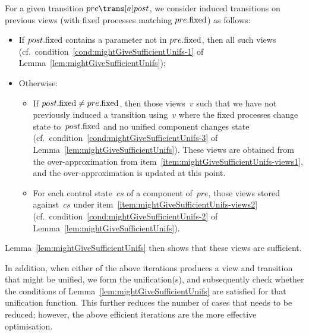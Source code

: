 For a given transition $pre \trans[a] post$, we consider induced transitions
on previous views (with fixed processes matching $pre.\mathrm{fixed}$) as follows:
%
\begin{itemize}
\item If $post.\mathrm{fixed}$ contains a parameter not in $pre.\mathrm{fixed}$, then all such
  views (cf.~condition~\ref{cond:mightGiveSufficientUnifs-1} of
  Lemma~\ref{lem:mightGiveSufficientUnifs});

\item Otherwise:
  \begin{itemize}
  \item If $post.\mathrm{fixed} \ne pre.\mathrm{fixed}$, then those views~$v$ such that we
    have not previously induced a transition using~$v$ where the fixed
    processes change state to~$post.\mathrm{fixed}$ and no unified component changes
    state (cf.~condition~\ref{cond:mightGiveSufficientUnifs-3} of
    Lemma~\ref{lem:mightGiveSufficientUnifs}).  These views are obtained from
    the over-approximation from
    item~\ref{item:mightGiveSufficientUnifs-views1}, and the
    over-approximation is updated at this point.

  \item For each control state~$cs$ of a component of~$pre$, those views
    stored against~$cs$ under item~\ref{item:mightGiveSufficientUnifs-views2}
    (cf.~condition~\ref{cond:mightGiveSufficientUnifs-2} of
    Lemma~\ref{lem:mightGiveSufficientUnifs}).
  \end{itemize}
\end{itemize}
%
Lemma~\ref{lem:mightGiveSufficientUnifs} then shows that these views are
sufficient.

In addition, when either of the above iterations produces a view and
transition that might be unified, we form the unification(s), and subsequently
check whether the conditions of Lemma~\ref{lem:mightGiveSufficientUnifs} are
satisfied for that unification function.  This further reduces the number of
cases that needs to be reduced; however, the above efficient iterations are
the more effective optimisation. 





